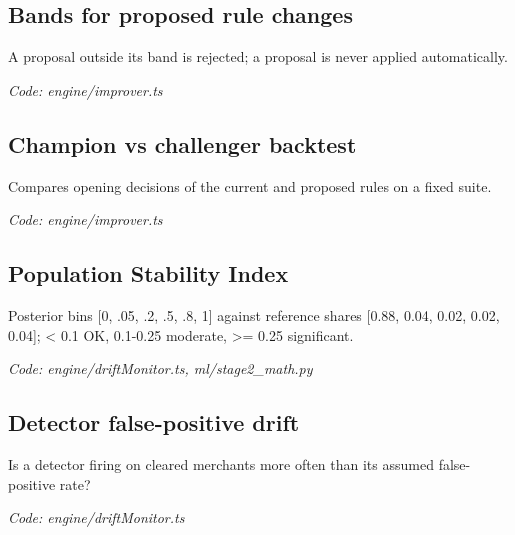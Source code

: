 \documentclass[11pt,a4paper]{article}
\newcommand{\where}[1]{\par{\small\itshape\color{mute}Code: #1}\par}
\begin{document}
\subsection*{Bands for proposed rule changes}
\par\smallskip\noindent{}\par\smallskip
A proposal outside its band is rejected; a proposal is never applied automatically.
\where{engine/improver.ts}

\subsection*{Champion vs challenger backtest}
\par\smallskip\noindent{}\par\smallskip
Compares opening decisions of the current and proposed rules on a fixed suite.
\where{engine/improver.ts}

\subsection*{Population Stability Index}
\par\smallskip\noindent{}\par\smallskip
Posterior bins [0, .05, .2, .5, .8, 1] against reference shares [0.88, 0.04, 0.02, 0.02, 0.04]; \textless{} 0.1 OK, 0.1-0.25 moderate, \textgreater{}= 0.25 significant.
\where{engine/driftMonitor.ts, ml/stage2\_math.py}

\subsection*{Detector false-positive drift}
\par\smallskip\noindent{}\par\smallskip
Is a detector firing on cleared merchants more often than its assumed false-positive rate?
\where{engine/driftMonitor.ts}
\end{document}
